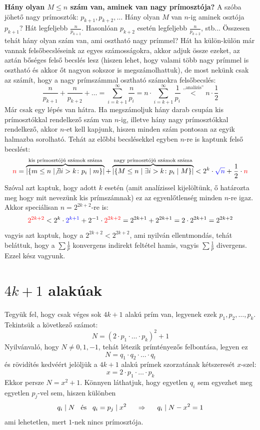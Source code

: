 \documentclass[12pt]{book}
\theoremstyle{plain} %
\theoremstyle{definition} %
\theoremstyle{remark}
\numberwithin{equation}{section}  %
\begin{document}
	\textbf{Hány olyan $M\leq n$ szám van, aminek van nagy prímosztója?} A szóba jöhető nagy prímosztók: $p_{k+1},p_{k+2},\ldots$ Hány olyan $M$ van $n$-ig aminek osztója $p_{k+1}$? Hát legfeljebb $\frac{n}{p_{k+1}}$. Hasonlóan $p_{k+2}$ esetén legfeljebb $\frac{n}{p_{k+2}}$, stb... Összesen tehát hány olyan szám van, ami osztható nagy prímmel? Hát ha külön-külön már vannak felsőbecsléseink az egyes számosságokra, akkor adjuk össze ezeket, az aztán bőséges felső becslés lesz (hiszen lehet, hogy valami több nagy prímmel is osztható és akkor őt nagyon sokszor is megszámolhattuk), de most nekünk csak az számít, hogy a nagy prímszámmal osztható számokra felsőbecslés:
	\[  \dfrac{n}{p_{k+1}} + \dfrac{n}{p_{k+2}} + \ldots = \sum_{i=k+1}^{\infty} \dfrac{n}{p_{i}} = n\cdot \sum_{i=k+1}^{\infty} \dfrac{1}{p_{i}} \stackrel{\text{,,analízis''}}{<} n\cdot \dfrac{1}{2}  \]
	Már csak egy lépés van hátra. Ha megszámoljuk hány darab csupán kis prímosztókkal rendelkező szám van $n$-ig, illetve hány nagy prímosztókkal rendelkező, akkor $n$-et kell kapjunk, hiszen minden szám pontosan az egyik halmazba sorolható. Tehát az előbbi becslésekkel egyben $n$-re is kaptunk felső becslést:
	\[ \color{red}n \color{black} = \overbrace{|\{m \leq n \mid \not\exists i>k\colon p_i \mid m \}|}^{\text{kis prímosztójú számok száma}} + \overbrace{|\{M \leq n \mid \exists i>k\colon p_i \mid M \}|}^{\text{nagy prímosztójú számok száma}} < 2^k \cdot \color{blue} \sqrt{n} \color{black} + \dfrac{1}{2} \cdot \color{red} n \color{black} \]
	Szóval azt kaptuk, hogy adott $k$ esetén (amit analízissel kijelöltünk, ő határozta meg hogy mit nevezünk kis prímszámnak) ez az egyenlőtlenség minden $n$-re igaz. Akkor speciálisan $n=2^{2k+2}$-re is:
	\[ \color{red} 2^{2k+2} \color{black} < 2^k \cdot \color{blue} 2^{k+1} \color{black} + 2^{-1} \cdot \color{red} 2^{2k+2} \color{black} = 2^{2k+1} + 2^{2k+1} = 2\cdot 2^{2k+1} = 2^{2k+2} \]
	vagyis azt kaptuk, hogy a $2^{2k+2}<2^{2k+2}$, ami nyilván ellentmondás, tehát beláttuk, hogy a $\sum \frac{1}{p}$ konvergens indirekt feltétel hamis, vagyis $\sum \frac{1}{p}$ divergens. Ezzel kész vagyunk.
	
	\section{$4k+1$ alakúak}
	
	Tegyük fel, hogy csak véges sok $4k+1$ alakú prím van, legyenek ezek $p_1,p_2,\ldots,p_k$. Tekintsük a következő számot:
	\[ N = (2\cdot p_1\cdot \ldots \cdot p_k)^2 + 1  \]
	Nyilvánvaló, hogy $N\neq 0,1,-1$, tehát létezik prímtényezős felbontása, legyen ez
	\[ N = q_1\cdot q_2\cdot \ldots \cdot q_t  \]
	és rövidítés kedvéért jelöljük a $4k+1$ alakú prímek szorzatának kétszeresét $x$-szel:
	\[ x = 2\cdot p_1\cdot \ldots \cdot p_k   \]
	Ekkor persze $N=x^2+1$. Könnyen láthatjuk, hogy egyetlen $q_i$ sem egyezhet meg egyetlen $p_j$-vel sem, hiszen különben
	\[ q_i \mid N \hspace{3mm} \text{és} \hspace{3mm} q_i=p_j\mid x^2 \hspace{5mm} \Rightarrow \hspace{5mm} q_i\mid N-x^2=1  \]
	ami lehetetlen, mert $1$-nek nincs prímosztója.
	
\end{document}
